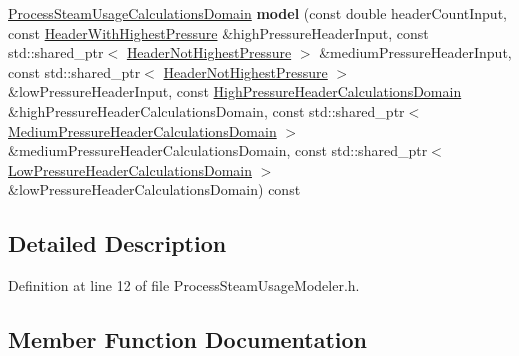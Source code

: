 \begin{DoxyCompactItemize}
\item 
\mbox{\label{class_process_steam_usage_modeler_a109cb58f14a1f81394bf3457ff4a157e}} 
\hyperlink{class_process_steam_usage_calculations_domain}{Process\+Steam\+Usage\+Calculations\+Domain} {\bfseries model} (const double header\+Count\+Input, const \hyperlink{class_header_with_highest_pressure}{Header\+With\+Highest\+Pressure} \&high\+Pressure\+Header\+Input, const std\+::shared\+\_\+ptr$<$ \hyperlink{class_header_not_highest_pressure}{Header\+Not\+Highest\+Pressure} $>$ \&medium\+Pressure\+Header\+Input, const std\+::shared\+\_\+ptr$<$ \hyperlink{class_header_not_highest_pressure}{Header\+Not\+Highest\+Pressure} $>$ \&low\+Pressure\+Header\+Input, const \hyperlink{class_high_pressure_header_calculations_domain}{High\+Pressure\+Header\+Calculations\+Domain} \&high\+Pressure\+Header\+Calculations\+Domain, const std\+::shared\+\_\+ptr$<$ \hyperlink{class_medium_pressure_header_calculations_domain}{Medium\+Pressure\+Header\+Calculations\+Domain} $>$ \&medium\+Pressure\+Header\+Calculations\+Domain, const std\+::shared\+\_\+ptr$<$ \hyperlink{class_low_pressure_header_calculations_domain}{Low\+Pressure\+Header\+Calculations\+Domain} $>$ \&low\+Pressure\+Header\+Calculations\+Domain) const
\end{DoxyCompactItemize}


\subsection{Detailed Description}


Definition at line 12 of file Process\+Steam\+Usage\+Modeler.\+h.



\subsection{Member Function Documentation}
\mbox{\label{class_process_steam_usage_modeler_a109cb58f14a1f81394bf3457ff4a157e}} 

